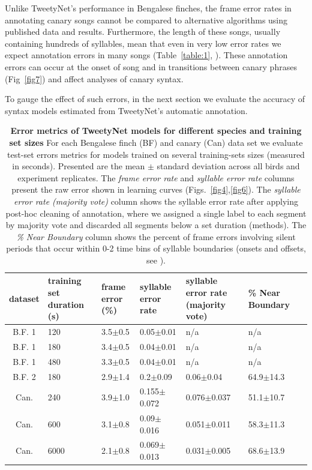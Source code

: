\documentclass[10pt,letterpaper]{article}
\begin{document}
Unlike TweetyNet's performance in Bengalese finches, the frame error rates in annotating canary songs cannot be compared to alternative algorithms using published data and results. Furthermore, the length of these songs, usually containing hundreds of syllables, mean that even in very low error rates we expect annotation errors in many songs (Table~\ref{table:1}, ). These annotation errors can occur at the onset of song and in transitions between canary phrases (Fig~\ref{fig7}) and affect analyses of canary syntax. 

To gauge the effect of such errors, in the next section we evaluate the accuracy of syntax models estimated from TweetyNet's automatic annotation. 
\begin{table}[h!]
\centering
\begin{tabular}{ | c || m{5em} | m{5em} | m{5em} | m{5em} | m{5em} || m{5em} |  }
 \hline
 dataset & training set duration (s) & frame error (\%) & syllable error rate & syllable error rate (majority vote) & \% Near Boundary \\
 \hline
B.F. 1            & 120 & 3.5$\pm$0.5 & 0.05$\pm$0.01 & n/a & n/a\\
\hline
B.F. 1            & 180 & 3.4$\pm$0.5 & 0.04$\pm$0.01 & n/a & n/a\\
\hline
B.F. 1            & 480 & 3.3$\pm$0.5 & 0.04$\pm$0.01 & n/a & n/a\\
\hline
B.F. 2 & 180 & 2.9$\pm$1.4 & 0.2$\pm$0.09 & 0.06$\pm$0.04 & 64.9$\pm$14.3\\
\hline
Can. & 240 & 3.9$\pm$1.0 & 0.155$\pm$0.072 & 0.076$\pm$0.037 & 51.1$\pm$10.7\\
\hline
Can. & 600 & 3.1$\pm$0.8 & 0.09$\pm$0.016 & 0.051$\pm$0.011 & 58.3$\pm$11.3\\
\hline
Can. & 6000 & 2.1$\pm$0.8 & 0.069$\pm$0.013 & 0.031$\pm$0.005 & 68.6$\pm$13.9\\
 \hline
\end{tabular}
\caption{{\bf Error metrics of TweetyNet models for different species and training set sizes}
For each Bengalese finch (BF) and canary (Can) data set we evaluate test-set errors metrics for models trained on several training-sets sizes (measured in seconds). Presented are the mean $\pm$ standard deviation across all birds and experiment replicates. The \textit{frame error rate}  and \textit{syllable error rate} columns present the raw error shown in learning curves (Figs.~\ref{fig4},\ref{fig6}). The \textit{syllable error rate (majority vote)} column shows the syllable error rate after applying post-hoc cleaning of annotation, where we assigned a single label to each segment by majority vote and discarded all segments below a set duration (methods). The \textit{\% Near Boundary} column shows the percent of frame errors involving silent periods that occur within 0-2 time bins of syllable boundaries (onsets and offsets, see ).}

\end{table}
\end{document}
